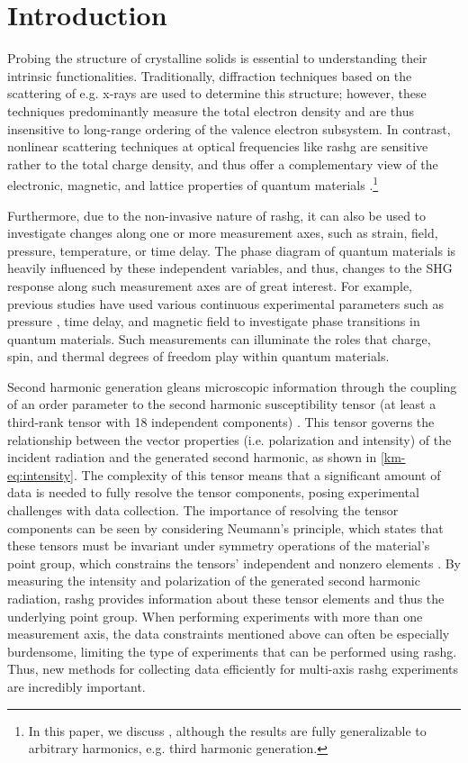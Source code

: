 \section{\label{km-sec:intro} Introduction}

Probing the structure of crystalline solids is essential to understanding their intrinsic functionalities. 
Traditionally, diffraction techniques based on the scattering of e.g. x-rays are used to determine this structure; however, these techniques predominantly measure the total electron density and are thus insensitive to long-range ordering of the valence electron subsystem.
In contrast, nonlinear scattering techniques at optical frequencies like \gls{rashg} are sensitive rather to the total charge density, and thus offer a complementary view of the electronic, magnetic, and lattice properties of quantum materials \citep{torchinsky_low_2014, fichera_second_2020}.\footnote{In this paper, we discuss , although the results are fully generalizable to arbitrary harmonics, e.g. third harmonic generation.}


Furthermore, due to the non-invasive nature of \gls{rashg}, it can also be used to investigate changes along one or more measurement axes, such as strain, field, pressure, temperature, or time delay.
The phase diagram of quantum materials is heavily influenced by these independent variables, and thus, changes to the SHG response along such measurement axes are of great interest.
For example, previous studies have used various continuous experimental parameters such as pressure \citep{li_high-pressure_2022}, time delay\citep{shan_giant_2021}, and magnetic field to investigate phase transitions in quantum materials.
Such measurements can illuminate the roles that charge, spin, and thermal degrees of freedom play within quantum materials.

Second harmonic generation gleans microscopic information through the coupling of an order parameter to the second harmonic susceptibility tensor (at least a third-rank tensor with 18 independent components) \citep{boyd}. 
This tensor governs the relationship between the vector properties (i.e. polarization and intensity) of the incident radiation and the generated second harmonic, as shown in \cref{km-eq:intensity}.
The complexity of this tensor means that a significant amount of data is needed to fully resolve the tensor components, posing experimental challenges with data collection.
The importance of resolving the tensor components can be seen by considering Neumann's principle, which states that these tensors must be invariant under symmetry operations of the material's point group, which constrains the tensors' independent and nonzero elements \citep{birss}. 
By measuring the intensity and polarization of the generated second harmonic radiation, \gls{rashg} provides information about these tensor elements and thus the underlying point group.
When performing experiments with more than one measurement axis, the data constraints mentioned above can often be especially burdensome, limiting the type of experiments that can be performed using \gls{rashg}.
Thus, new methods for collecting data efficiently for multi-axis \gls{rashg} experiments are incredibly important.

